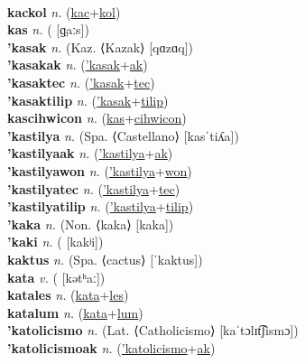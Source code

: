  \label{kackas} \\
\textbf{kackol} \textit{n.} (\hyperref[kac]{kac}+\hyperref[kol]{kol})
 \label{kackol} \\
\textbf{kas} \textit{n.} ( [ɡ̤aːs])
 \label{kas} \\
\textbf{'kasak} \textit{n.} (Kaz. ⟨Kazak⟩ [qɑzɑq])
 \label{'kasak} \\
\textbf{'kasakak} \textit{n.} (\hyperref['kasak]{'kasak}+\hyperref[ak]{ak})
 \label{'kasakak} \\
\textbf{'kasaktec} \textit{n.} (\hyperref['kasak]{'kasak}+\hyperref[tec]{tec})
 \label{'kasaktec} \\
\textbf{'kasaktilip} \textit{n.} (\hyperref['kasak]{'kasak}+\hyperref[tilip]{tilip})
 \label{'kasaktilip} \\
\textbf{kascihwicon} \textit{n.} (\hyperref[kas]{kas}+\hyperref[cihwicon]{cihwicon})
 \label{kascihwicon} \\
\textbf{'kastilya} \textit{n.} (Spa. ⟨Castellano⟩ [kasˈtiʎa])
 \label{'kastilya} \\
\textbf{'kastilyaak} \textit{n.} (\hyperref['kastilya]{'kastilya}+\hyperref[ak]{ak})
 \label{'kastilyaak} \\
\textbf{'kastilyawon} \textit{n.} (\hyperref['kastilya]{'kastilya}+\hyperref[won]{won})
 \label{'kastilyawon} \\
\textbf{'kastilyatec} \textit{n.} (\hyperref['kastilya]{'kastilya}+\hyperref[tec]{tec})
 \label{'kastilyatec} \\
\textbf{'kastilyatilip} \textit{n.} (\hyperref['kastilya]{'kastilya}+\hyperref[tilip]{tilip})
 \label{'kastilyatilip} \\
\textbf{'kaka} \textit{n.} (Non. ⟨kaka⟩ [kaka])
 \label{'kaka} \\
\textbf{'kaki} \textit{n.} ( [kakʲi])
 \label{'kaki} \\
\textbf{kaktus} \textit{n.} (Spa. ⟨cactus⟩ [ˈkaktus])
 \label{kaktus} \\
\textbf{kata} \textit{v.} ( [kətʰaː])
 \label{kata} \\
\textbf{katales} \textit{n.} (\hyperref[kata]{kata}+\hyperref[les]{les})
 \label{katales} \\
\textbf{katalum} \textit{n.} (\hyperref[kata]{kata}+\hyperref[lum]{lum})
 \label{katalum} \\
\textbf{'katolicismo} \textit{n.} (Lat. ⟨Catholicismo⟩ [kaˈtɔlɪt͡ʃismɔ])
 \label{'katolicismo} \\
\textbf{'katolicismoak} \textit{n.} (\hyperref['katolicismo]{'katolicismo}+\hyperref[ak]{ak})
